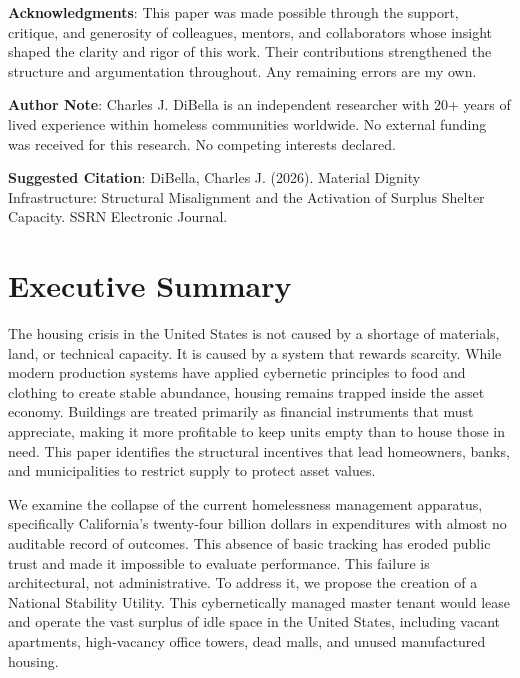 \documentclass[
  12pt,
]{article}
\begin{document}
\textbf{Acknowledgments}: This paper was made possible through the support, critique, and generosity of colleagues, mentors, and collaborators whose insight shaped the clarity and rigor of this work. Their contributions strengthened the structure and argumentation throughout. Any remaining errors are my own.

\textbf{Author Note}: Charles J. DiBella is an independent researcher with 20+ years of lived experience within homeless communities worldwide. No external funding was received for this research. No competing interests declared.

\textbf{Suggested Citation}: DiBella, Charles J. (2026). Material Dignity Infrastructure: Structural Misalignment and the Activation of Surplus Shelter Capacity. SSRN Electronic Journal.

\newpage

\hypertarget{executive-summary}{%
\section{Executive Summary}\label{executive-summary}}

The housing crisis in the United States is not caused by a shortage of materials, land, or technical capacity. It is caused by a system that rewards scarcity. While modern production systems have applied cybernetic principles to food and clothing to create stable abundance, housing remains trapped inside the asset economy. Buildings are treated primarily as financial instruments that must appreciate, making it more profitable to keep units empty than to house those in need. This paper identifies the structural incentives that lead homeowners, banks, and municipalities to restrict supply to protect asset values.

We examine the collapse of the current homelessness management apparatus, specifically California's twenty‑four billion dollars in expenditures with almost no auditable record of outcomes. This absence of basic tracking has eroded public trust and made it impossible to evaluate performance. This failure is architectural, not administrative. To address it, we propose the creation of a National Stability Utility. This cybernetically managed master tenant would lease and operate the vast surplus of idle space in the United States, including vacant apartments, high‑vacancy office towers, dead malls, and unused manufactured housing.
\end{document}
